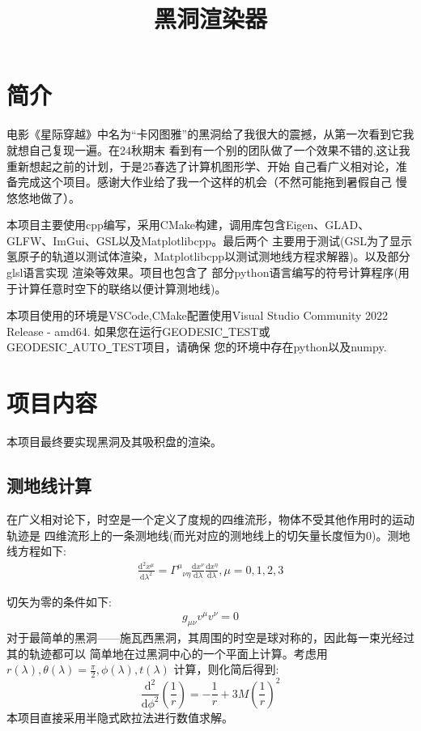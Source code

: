 \documentclass[a4paper, 12pt]{article}
\begin{document}
    \title{黑洞渲染器}
    \maketitle
    \section{简介}
    电影《星际穿越》中名为“卡冈图雅”的黑洞给了我很大的震撼，从第一次看到它我就想自己复现一遍。在24秋期末
    看到有一个别的团队做了一个效果不错的,这让我重新想起之前的计划，于是25春选了计算机图形学、开始
    自己看广义相对论，准备完成这个项目。感谢大作业给了我一个这样的机会（不然可能拖到暑假自己
    慢悠悠地做了）。

    本项目主要使用cpp编写，采用CMake构建，调用库包含Eigen、GLAD、GLFW、ImGui、GSL以及Matplotlibcpp。最后两个
    主要用于测试(GSL为了显示氢原子的轨道以测试体渲染，Matplotlibcpp以测试测地线方程求解器)。以及部分glsl语言实现
    渲染等效果。项目也包含了
    部分python语言编写的符号计算程序(用于计算任意时空下的联络以便计算测地线)。

    本项目使用的环境是VSCode,CMake配置使用Visual Studio Community 2022 Release - amd64.
    如果您在运行GEODESIC\underline \ TEST或\\GEODESIC\underline \ AUTO\underline \ TEST项目，请确保
    您的环境中存在python以及numpy.
    \section{项目内容}
    本项目最终要实现黑洞及其吸积盘的渲染。
    \subsection{测地线计算}
    在广义相对论下，时空是一个定义了度规的四维流形，物体不受其他作用时的运动轨迹是
    四维流形上的一条测地线(而光对应的测地线上的切矢量长度恒为0)。测地线方程如下:
    \begin{align*}
        \frac{\mathrm d^2 x^{\mu}}{\mathrm d \lambda ^2} = {\Gamma^{\mu}}_{\nu\eta}\frac{\mathrm d x^{\nu}}{\mathrm d \lambda}\frac{\mathrm d x^{\eta}}{\mathrm d \lambda} ,\mu = 0,1,2,3 
    \end{align*}
    \par 切矢为零的条件如下:
    \begin{align*}
        g_{\mu\nu}v^{\mu}v^{\nu} = 0
    \end{align*}
    对于最简单的黑洞——施瓦西黑洞，其周围的时空是球对称的，因此每一束光经过其的轨迹都可以
    简单地在过黑洞中心的一个平面上计算。考虑用$r(\lambda),\theta(\lambda) = \frac{\pi}{2} ,\phi(\lambda),t(\lambda)$
    计算，则化简后得到:
    \[\frac{\mathrm d^2 }{\mathrm d \phi^2}(\frac{1}{r} )= -\frac{1}{r} + 3 M (\frac{1}{r} )^2 \]
    本项目直接采用半隐式欧拉法进行数值求解。
\end{document}
